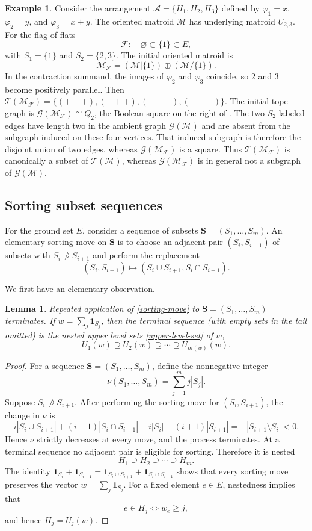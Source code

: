 \documentclass[10pt]{amsart}
\theoremstyle{plain}
\newtheorem{lemma}[theorem]{Lemma}
\theoremstyle{definition}
\newtheorem{example}[theorem]{Example}
\newcommand{\one}{\mathbf{1}}
\newcommand{\A}{\mathcal{A}}
\newcommand{\T}{\mathcal{T}}
\newcommand{\F}{\mathcal{F}}
\newcommand{\G}{\mathcal{G}}
\newcommand{\M}{\mathcal{M}}
\newcommand{\bS}{\boldsymbol{S}}
\begin{document}
\begin{example}\label{three-line-minors}
Consider the arrangement $\A=\{H_1,H_2,H_3\}$ defined by $\varphi_1=x$, $\varphi_2=y$, and $\varphi_3=x+y$. The oriented matroid $\M$ has underlying matroid $U_{2,3}$. For the flag of flats
\[
\F:\quad \varnothing\subset\{1\}\subset E,
\]
with $S_1=\{1\}$ and $S_2=\{2,3\}$. The initial oriented matroid is
\[
\M_{\F}=(\M|\{1\})\oplus(\M/\{1\}).
\]
In the contraction summand, the images of $\varphi_2$ and $\varphi_3$ coincide, so $2$ and $3$ become positively parallel. Then $\T(\M_{\F})=\{(+++),(-++),(+--),(---)\}$. The initial tope graph is $\G(\M_{\F})\cong Q_2$, the Boolean square on the right of . The two $S_2$-labeled edges have length two in the ambient graph $\G(\M)$ and are absent from the subgraph induced on these four vertices. That induced subgraph is therefore the disjoint union of two edges, whereas $\G(\M_{\F})$ is a square. Thus $\T(\M_{\F})$ is canonically a subset of $\T(\M)$, whereas $\G(\M_{\F})$ is in general not a subgraph of $\G(\M)$.
\end{example}



\subsection{Sorting subset sequences}

For the ground set $E$, consider a sequence of subsets $\bS=(S_1,\ldots,S_m)$. An elementary sorting move on $\bS$ is to choose an adjacent pair $(S_i,S_{i+1})$ of subsets with $S_i\not\supseteq S_{i+1}$ and perform the replacement
\begin{equation}\label{sorting-move}
(S_i,S_{i+1})\longmapsto(S_i\cup S_{i+1},S_i\cap S_{i+1}).
\end{equation}

We first have an elementary observation.
\begin{lemma}\label{set-sorting}
Repeated application of \eqref{sorting-move} to $\bS=(S_1,\ldots,S_m)$ terminates. If $w=\sum_j\one_{S_j}$, then the terminal sequence (with empty sets in the tail omitted) is the nested upper level sets \eqref{upper-level-set} of $w$,
\[
U_1(w)\supseteq U_2(w)\supseteq\cdots\supseteq U_{m(w)}(w).
\]
\end{lemma}

\begin{proof}
For a sequence $\bS=(S_1,\ldots,S_m)$, define the nonnegative integer
\[
\nu(S_1,\ldots,S_m)=\sum_{j=1}^m j|S_j|.
\]
Suppose $S_i\not\supseteq S_{i+1}$. After performing the sorting move for $(S_i,S_{i+1})$, the change in $\nu$ is
\[
i|S_i\cup S_{i+1}|+(i+1)|S_i\cap S_{i+1}|-i|S_i|-(i+1)|S_{i+1}|=-|S_{i+1}\setminus S_i|<0.
\]
Hence $\nu$ strictly decreases at every move, and the process terminates. At a terminal sequence no adjacent pair is eligible for sorting. Therefore it is nested
\[
H_1\supseteq H_2\supseteq\cdots\supseteq H_m.
\]
The identity $\one_{S_i}+\one_{S_{i+1}}=\one_{S_i\cup S_{i+1}}+\one_{S_i\cap S_{i+1}}$ shows that every sorting move preserves the vector $w=\sum_j\one_{S_j}$. For a fixed element $e\in E$, nestedness implies that
\[
e\in H_j\iff w_e\geq j,
\]
and hence $H_j=U_j(w)$.
\end{proof}
\end{document}
